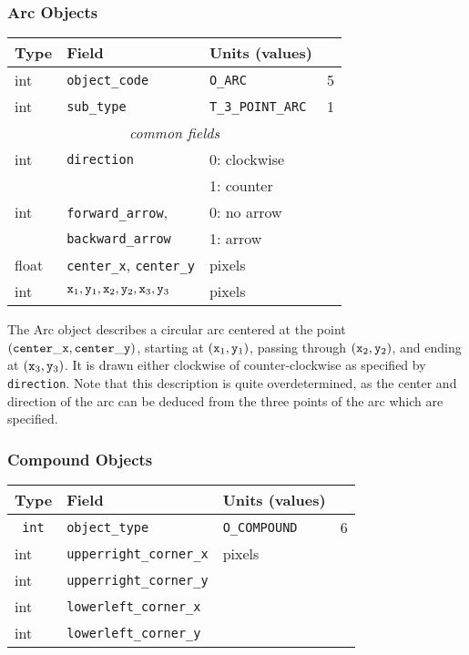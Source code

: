 \subsubsection{Arc Objects}
%
\begin{center}
\begin{tabular} {|l|l|ll|}
\hline
Type	& Field			& Units (values)	&	\\ \hline
\hline
%
int	& {\tt object\_code} 	& {\tt O\_ARC}		& 5	\\ \hline
%
int	& {\tt sub\_type}	& {\tt T\_3\_POINT\_ARC}& 1	\\ \hline
%
\multicolumn{4}{c}{\it common fields}				\\ \hline
%
int	& {\tt direction}	& 0: clockwise		&	\\
	&			& 1: counter		&	\\ \hline
%
int	& {\tt forward\_arrow},	& 0: no arrow		&	\\
	& {\tt backward\_arrow}	& 1: arrow		&	\\ \hline
%
float	& {\tt center\_x},
	  {\tt center\_y}	& pixels		&	\\ \hline
%
int   	& ${\tt x}_1, {\tt y}_1,
	   {\tt x}_2, {\tt y}_2,
	   {\tt x}_3, {\tt y}_3$& pixels		&	\\ \hline
\end{tabular}
\end{center}
%
The Arc object describes a circular arc centered at the point
	\linebreak $({\tt center\_x}, {\tt center\_y})$, starting at 
	$({\tt x}_1, {\tt y}_1)$, passing through $({\tt x}_2, {\tt y}_2)$,
	and ending at $({\tt x}_3, {\tt y}_3)$.
It is drawn either clockwise of counter-clockwise as specified by
	{\tt direction}.
Note that this description is quite overdetermined, as the center and
	direction of the arc can be deduced from the three points
 	of the arc which are specified.
	 
\subsubsection{Compound Objects}

\begin{center}
\begin{tabular}{|l|l|ll|}
\hline
Type 	& Field			& Units (values) 		&	\\ \hline
\hline
\tt
int	& {\tt object\_type}	& {\tt O\_COMPOUND}		& 6	\\ \hline
%
int	& {\tt upperright\_corner\_x}	& pixels		&	\\
int	& {\tt upperright\_corner\_y}	& 			&	\\
int	& {\tt lowerleft\_corner\_x}	& 			&	\\
int	& {\tt lowerleft\_corner\_y}	& 			&	\\ \hline
\end{tabular}
\end{center}

